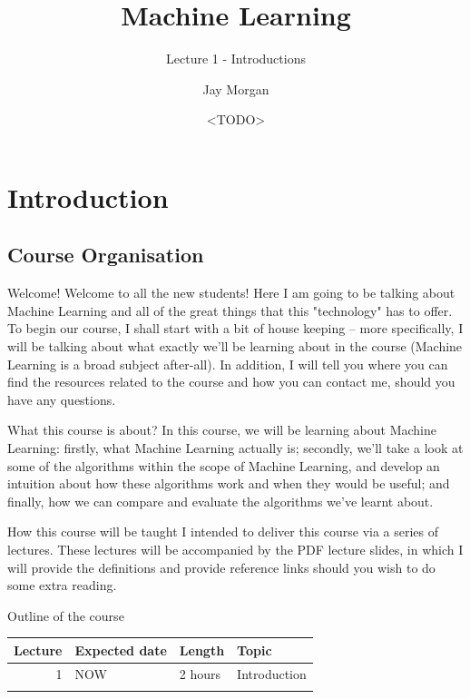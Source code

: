 \documentclass[10pt]{beamer}
\author{Jay Morgan}
\date{<TODO>}
\title{Machine Learning}
\subtitle{Lecture 1 - Introductions}
\begin{document}
\maketitle

\section*{Introduction}
\label{sec:org7d35b1a}

\subsection*{Course Organisation}
\label{sec:org217a17d}

\begin{frame}[label={sec:orgb906749}]{Welcome!}
Welcome to all the new students! Here I am going to be talking about Machine Learning
and all of the great things that this "technology" has to offer. To begin our course,
I shall start with a bit of house keeping -- more specifically, I will be talking
about what exactly we'll be learning about in the course (Machine Learning is a broad
subject after-all). In addition, I will tell you where you can find the resources
related to the course and how you can contact me, should you have any questions.
\end{frame}

\begin{frame}[label={sec:orgc9d59a5}]{What this course is about?}
In this course, we will be learning about Machine Learning: firstly, what Machine
Learning actually is; secondly, we'll take a look at some of the algorithms within
the scope of Machine Learning, and develop an intuition about how these algorithms
work and when they would be useful; and finally, how we can compare and evaluate the
algorithms we've learnt about.
\end{frame}

\begin{frame}[label={sec:org7c244e8}]{How this course will be taught}
I intended to deliver this course via a series of lectures. These lectures will be
accompanied by the PDF lecture slides, in which I will provide the definitions and
provide reference links should you wish to do some extra reading.
\end{frame}

\begin{frame}[label={sec:org82a1406}]{Outline of the course}
\begin{center}
\begin{tabular}{rlll}
\toprule
Lecture & Expected date & Length & Topic\\
\midrule
1 & NOW & 2 hours & Introduction\\
 &  &  & \\
\bottomrule
\end{tabular}
\end{center}
\end{frame}
\end{document}
